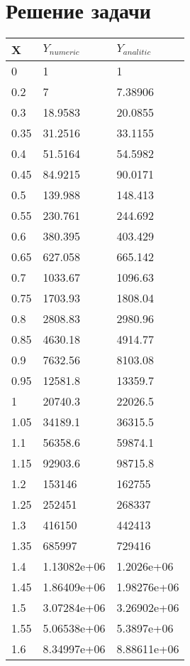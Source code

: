\documentclass[a4paper,14pt]{extarticle}
\begin{document}
\section{Решение задачи}

\begin{longtable}{|m{3cm}|m{3cm}|m{3cm}|}
\hline
\cellcolor{lightgray} X & \cellcolor{lightgray} $Y_{numeric}$ & \cellcolor{lightgray} $Y_{analitic}$\\
\hline
0 & 1 & 1\\
\hline
0.2 & 7 & 7.38906\\
\hline
0.3 & 18.9583 & 20.0855\\
\hline
0.35 & 31.2516 & 33.1155\\
\hline
0.4 & 51.5164 & 54.5982\\
\hline
0.45 & 84.9215 & 90.0171\\
\hline
0.5 & 139.988 & 148.413\\
\hline
0.55 & 230.761 & 244.692\\
\hline
0.6 & 380.395 & 403.429\\
\hline
0.65 & 627.058 & 665.142\\
\hline
0.7 & 1033.67 & 1096.63\\
\hline
0.75 & 1703.93 & 1808.04\\
\hline
0.8 & 2808.83 & 2980.96\\
\hline
0.85 & 4630.18 & 4914.77\\
\hline
0.9 & 7632.56 & 8103.08\\
\hline
0.95 & 12581.8 & 13359.7\\
\hline
1 & 20740.3 & 22026.5\\
\hline
1.05 & 34189.1 & 36315.5\\
\hline
1.1 & 56358.6 & 59874.1\\
\hline
1.15 & 92903.6 & 98715.8\\
\hline
1.2 & 153146 & 162755\\
\hline
1.25 & 252451 & 268337\\
\hline
1.3 & 416150 & 442413\\
\hline
1.35 & 685997 & 729416\\
\hline
1.4 & 1.13082e+06 & 1.2026e+06\\
\hline
1.45 & 1.86409e+06 & 1.98276e+06\\
\hline
1.5 & 3.07284e+06 & 3.26902e+06\\
\hline
1.55 & 5.06538e+06 & 5.3897e+06\\
\hline
1.6 & 8.34997e+06 & 8.88611e+06\\
\hline

\end{longtable}
\end{document}

